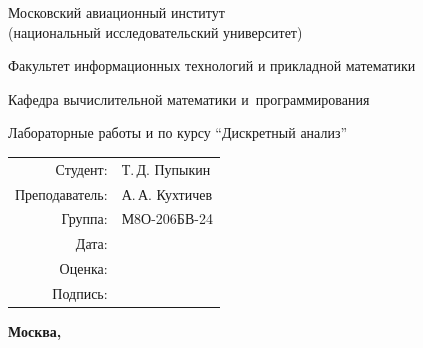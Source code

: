\begin{titlepage}
\begin{center}
\bfseries

{\Large Московский авиационный институт\\ (национальный исследовательский университет)

}

\vspace{48pt}

{\large Факультет информационных технологий и прикладной математики
}

\vspace{36pt}

{\large Кафедра вычислительной математики и~программирования

}


\vspace{48pt}

Лабораторные работы  и  по курсу \enquote{Дискретный анализ}

\end{center}

\vspace{72pt}

\begin{flushright}
\begin{tabular}{rl}
Студент: & Т.\,Д. Пупыкин \\
Преподаватель: & А.\,А. Кухтичев \\
Группа: & М8О-206БВ-24 \\
Дата: & \\
Оценка: & \\
Подпись: & \\
\end{tabular}
\end{flushright}

\vfill

\begin{center}
\bfseries
Москва, \the\year
\end{center}
\end{titlepage}

\pagebreak